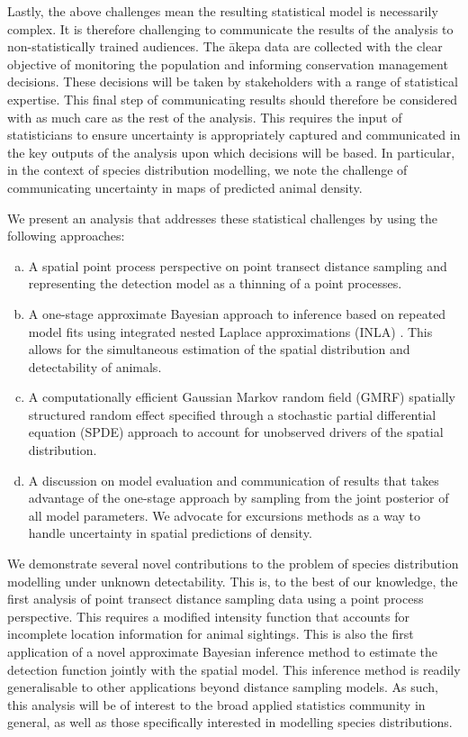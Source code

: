 \documentclass{statsoc}
\newcommand{\akepa}{\textquotesingle\={a}kepa}  %
\begin{document}
Lastly, the above challenges mean the resulting statistical model is necessarily complex. It is therefore challenging to communicate the results of the analysis to non-statistically trained audiences.  The \akepa{} data are collected with the clear objective of monitoring the population and informing conservation management decisions.  These decisions will be taken by stakeholders with a range of statistical expertise.  This final step of communicating results should therefore be considered with as much care as the rest of the analysis.  This requires the input of statisticians to ensure uncertainty is appropriately captured and communicated in the key outputs of the analysis upon which decisions will be based.  In particular, in the context of species distribution modelling, we note the challenge of communicating uncertainty in maps of predicted animal density.

We present an analysis that addresses these statistical challenges by using the following approaches:

\begin{enumerate}[(a)]
	\item A spatial point process perspective on point transect distance sampling and representing the detection model as a thinning of a point processes.
	\item A one-stage approximate Bayesian approach to inference based on repeated model fits using integrated nested Laplace approximations (INLA) \citep{rue_approximate_2009}.  This allows for the simultaneous estimation of the spatial distribution and detectability of animals.
	\item A computationally efficient Gaussian Markov random field (GMRF) spatially structured random effect specified through a stochastic partial differential equation (SPDE) approach \citep{lindgren_explicit_2011} to account for unobserved drivers of the spatial distribution.
	\item A discussion on model evaluation and communication of results that takes advantage of the one-stage approach by sampling from the joint posterior of all model parameters. We advocate for excursions methods \citep{bolin_excursion_2015} as a way to handle uncertainty in spatial predictions of density.  
\end{enumerate}

We demonstrate several novel contributions to the problem of species distribution modelling under unknown detectability.  This is, to the best of our knowledge, the first analysis of point transect distance sampling data using a point process perspective.  This requires a modified intensity function that accounts for incomplete location information for animal sightings.  This is also the first application of a novel approximate Bayesian inference method to estimate the detection function jointly with the spatial model.  This inference method is readily generalisable to other applications beyond distance sampling models.  As such, this analysis will be of interest to the broad applied statistics community in general, as well as those specifically interested in modelling species distributions.
\end{document}
